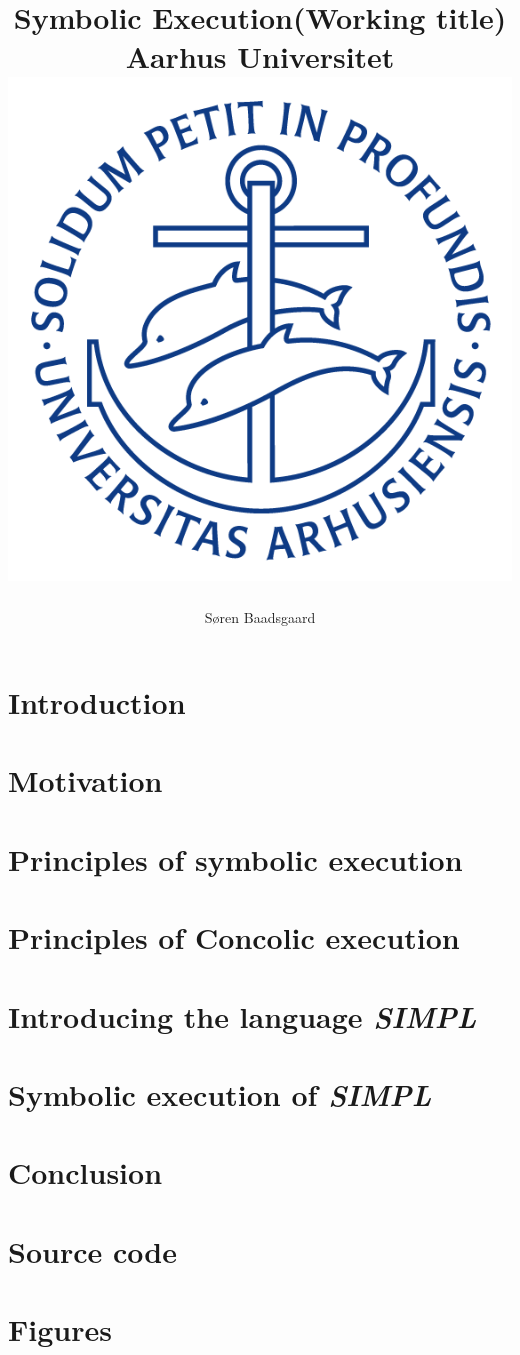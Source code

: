 \documentclass[]{report}
\title{
	\textbf{Symbolic Execution(Working title)}\\
	{\large Aarhus Universitet}\\
	{\includegraphics[scale=0.5]{ausegl_blaa.png}}	
	}
\author{Søren Baadsgaard}
\newcommand{\explanguage}{\textsl{SIMPL }}
\begin{document}
\maketitle

\begin{abstract}
\end{abstract}

\tableofcontents

\chapter{Introduction}
	
	
\chapter{Motivation}
	
\chapter{Principles of symbolic execution}
	
\chapter{Principles of Concolic execution}
	
\chapter{Introducing the language \explanguage}
	
\chapter{Symbolic execution of \explanguage}
	
\chapter{Conclusion}
	

\appendix

\chapter{Source code}
%
\chapter{Figures}



\end{document}
